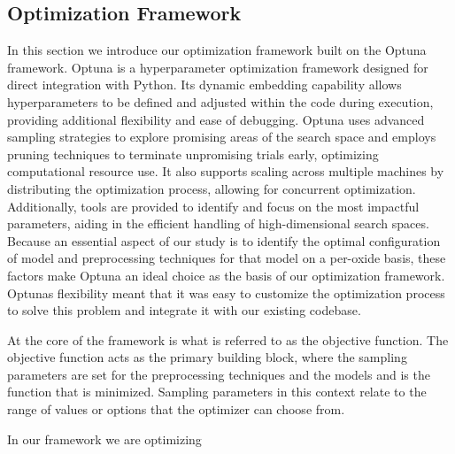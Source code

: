 \subsection{Optimization Framework}\label{sec:optimization-framework}
In this section we introduce our optimization framework built on the Optuna framework.
Optuna is a hyperparameter optimization framework designed for direct integration with Python. Its dynamic embedding capability allows hyperparameters to be defined and adjusted within the code during execution, providing additional flexibility and ease of debugging. 
Optuna uses advanced sampling strategies to explore promising areas of the search space and employs pruning techniques to terminate unpromising trials early, optimizing computational resource use. 
It also supports scaling across multiple machines by distributing the optimization process, allowing for concurrent optimization. 
Additionally, tools are provided to identify and focus on the most impactful parameters, aiding in the efficient handling of high-dimensional search spaces. \cite{optuna_2019} 
Because an essential aspect of our study is to identify the optimal configuration of model and preprocessing techniques for that model on a per-oxide basis, these factors make Optuna an ideal choice as the basis of our optimization framework.
Optunas flexibility meant that it was easy to customize the optimization process to solve this problem and integrate it with our existing codebase.

At the core of the framework is what is referred to as the objective function.
The objective function acts as the primary building block, where the sampling parameters are set for the preprocessing techniques and the models and is the function that is minimized.
Sampling parameters in this context relate to the range of values or options that the optimizer can choose from.

In our framework we are optimizing 



